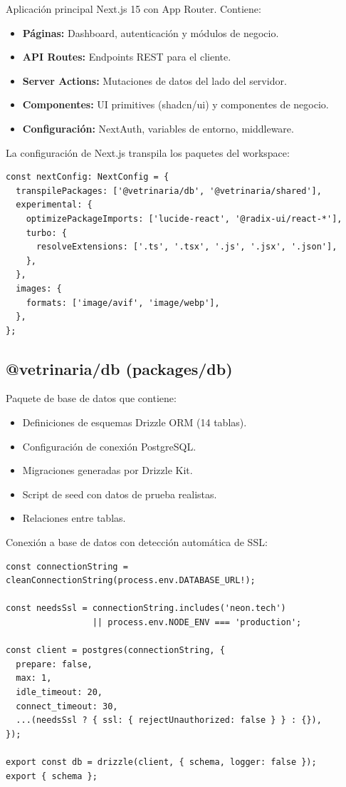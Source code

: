 Aplicaci\'on principal Next.js 15 con App Router. Contiene:

\begin{itemize}[leftmargin=*]
    \item \textbf{P\'aginas:} Dashboard, autenticaci\'on y m\'odulos de negocio.
    \item \textbf{API Routes:} Endpoints REST para el cliente.
    \item \textbf{Server Actions:} Mutaciones de datos del lado del servidor.
    \item \textbf{Componentes:} UI primitives (shadcn/ui) y componentes de negocio.
    \item \textbf{Configuraci\'on:} NextAuth, variables de entorno, middleware.
\end{itemize}

La configuraci\'on de Next.js transpila los paquetes del workspace:

\begin{lstlisting}[style=typescript, caption=next.config.ts]
const nextConfig: NextConfig = {
  transpilePackages: ['@vetrinaria/db', '@vetrinaria/shared'],
  experimental: {
    optimizePackageImports: ['lucide-react', '@radix-ui/react-*'],
    turbo: {
      resolveExtensions: ['.ts', '.tsx', '.js', '.jsx', '.json'],
    },
  },
  images: {
    formats: ['image/avif', 'image/webp'],
  },
};
\end{lstlisting}

\subsection{@vetrinaria/db (packages/db)}

Paquete de base de datos que contiene:

\begin{itemize}[leftmargin=*]
    \item Definiciones de esquemas Drizzle ORM (14 tablas).
    \item Configuraci\'on de conexi\'on PostgreSQL.
    \item Migraciones generadas por Drizzle Kit.
    \item Script de seed con datos de prueba realistas.
    \item Relaciones entre tablas.
\end{itemize}

Conexi\'on a base de datos con detecci\'on autom\'atica de SSL:

\begin{lstlisting}[style=typescript, caption=Conexion a PostgreSQL con postgres.js]
const connectionString = cleanConnectionString(process.env.DATABASE_URL!);

const needsSsl = connectionString.includes('neon.tech')
                 || process.env.NODE_ENV === 'production';

const client = postgres(connectionString, {
  prepare: false,
  max: 1,
  idle_timeout: 20,
  connect_timeout: 30,
  ...(needsSsl ? { ssl: { rejectUnauthorized: false } } : {}),
});

export const db = drizzle(client, { schema, logger: false });
export { schema };
\end{lstlisting}


